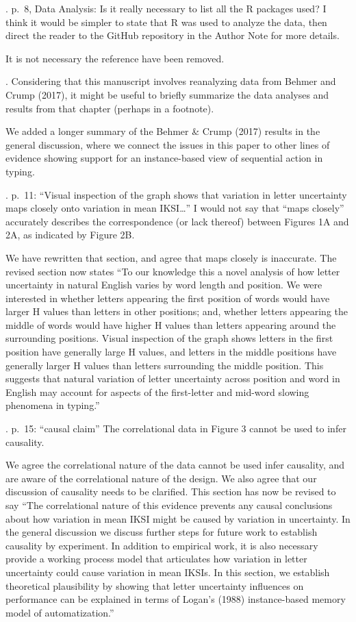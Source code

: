 \documentclass[draft]{article}
\begin{document}
. p.~8, Data Analysis: Is it really necessary to list all the R packages used? I think it would be simpler to state that R was used to analyze the data, then direct the reader to the GitHub repository in the Author Note for more details.

It is not necessary the reference have been removed.

. Considering that this manuscript involves reanalyzing data from Behmer and Crump (2017), it might be useful to briefly summarize the data analyses and results from that chapter (perhaps in a footnote).

We added a longer summary of the Behmer \& Crump (2017) results in the general discussion, where we connect the issues in this paper to other lines of evidence showing support for an instance-based view of sequential action in typing.

. p.~11: ``Visual inspection of the graph shows that variation in letter uncertainty maps closely onto variation in mean IKSI\ldots{}'' I would not say that ``maps closely'' accurately describes the correspondence (or lack thereof) between Figures 1A and 2A, as indicated by Figure 2B.

We have rewritten that section, and agree that maps closely is inaccurate. The revised section now states ``To our knowledge this a novel analysis of how letter uncertainty in natural English varies by word length and position. We were interested in whether letters appearing the first position of words would have larger H values than letters in other positions; and, whether letters appearing the middle of words would have higher H values than letters appearing around the surrounding positions. Visual inspection of the graph shows letters in the first position have generally large H values, and letters in the middle positions have generally larger H values than letters surrounding the middle position. This suggests that natural variation of letter uncertainty across position and word in English may account for aspects of the first-letter and mid-word slowing phenomena in typing.''

. p.~15: ``causal claim'' The correlational data in Figure 3 cannot be used to infer causality.

We agree the correlational nature of the data cannot be used infer causality, and are aware of the correlational nature of the design. We also agree that our discussion of causality needs to be clarified. This section has now be revised to say ``The correlational nature of this evidence prevents any causal conclusions about how variation in mean IKSI might be caused by variation in uncertainty. In the general discussion we discuss further steps for future work to establish causality by experiment. In addition to empirical work, it is also necessary provide a working process model that articulates how variation in letter uncertainty could cause variation in mean IKSIs. In this section, we establish theoretical plausibility by showing that letter uncertainty influences on performance can be explained in terms of Logan's (1988) instance-based memory model of automatization.''
\end{document}
